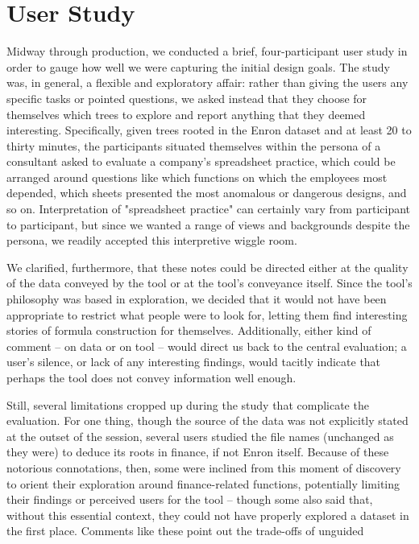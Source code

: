 \documentclass[conference]{IEEEtran}
\begin{document}
	\section{User Study} Midway through production, we conducted a brief,
	four-participant user study in order to gauge how well we were capturing the
	initial design goals. The study was, in general, a flexible and exploratory
	affair: rather than giving the users any specific tasks or pointed questions,
	we asked instead that they choose for themselves which trees to explore and
	report anything that they deemed interesting. Specifically, given trees rooted
	in the Enron dataset and at least 20 to thirty minutes, the participants
	situated themselves within the persona of a consultant asked to evaluate a
	company's spreadsheet practice, which could be arranged around questions like
	which functions on which the employees most depended, which sheets presented
	the most anomalous or dangerous designs, and so on. Interpretation of
	"spreadsheet practice" can certainly vary from participant to participant, but
	since we wanted a range of views and backgrounds despite the persona, we
	readily accepted this interpretive wiggle room. \par We clarified, furthermore,
	that these notes could be directed either at the quality of the data conveyed
	by the tool or at the tool's conveyance itself. Since the tool's philosophy was
	based in exploration, we decided that it would not have been appropriate to
	restrict what people were to look for, letting them find interesting stories of
	formula construction for themselves. Additionally, either kind of comment -- on
	data or on tool -- would direct us back to the central evaluation; a user's
	silence, or lack of any interesting findings, would tacitly indicate that
	perhaps the tool does not convey information well enough. \par Still, several
	limitations cropped up during the study that complicate the evaluation. For one
	thing, though the source of the data was not explicitly stated at the outset of
	the session, several users studied the file names (unchanged as they were) to
	deduce its roots in finance, if not Enron itself. Because of these notorious
	connotations, then, some were inclined from this moment of discovery to orient
	their exploration around finance-related functions, potentially limiting their
	findings or perceived users for the tool -- though some also said that, without
	this essential context, they could not have properly explored a dataset in the
	first place. Comments like these point out the trade-offs of unguided
\end{document}
